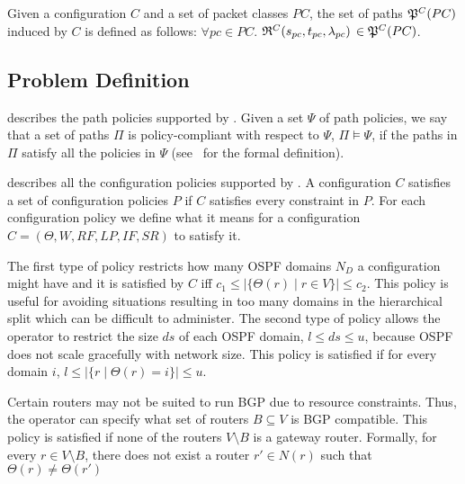 \begin{definition}
Given a configuration $C$ and a set of packet classes $PC$, the set of paths
$\mathfrak{P}^C(PC)$ induced by $C$ is defined as follows: 
$\forall pc \in PC.$ $\mathfrak{R}^C(s_{pc}, t_{pc}, \lambda_{pc})$ $\in \mathfrak{P}^C(PC)$.
\end{definition}

\subsection{Problem Definition}



 describes the path policies supported by \name.
Given  a set $\Psi$ of
path policies, we say that
a set of paths $\Pi$ is policy-compliant with respect to $\Psi$, $\Pi \models \Psi$,
if the paths in $\Pi$ satisfy all the policies in $\Psi$ (see~\cite{genesis} for the formal definition). 


 describes all the configuration policies supported by \name.
A configuration $C$ satisfies a set of configuration policies $P$
if $C$ satisfies every constraint in $P$.
For each configuration policy 
we define what it means for  a configuration $C=(\Theta,W,RF,LP,IF,SR)$ to satisfy it.

The first type of policy restricts how many OSPF domains $N_D$ a
configuration might have
and it is satisfied by $C$ iff $c_1\leq |\{\Theta(r)\mid r\in V\}|\leq
c_2$.  This policy is useful for avoiding situations resulting in too
many domains in the hierarchical split which can be difficult to
administer.  The second type of policy allows the operator to restrict
the size $ds$ of each OSPF domain, $l\leq ds\leq u$, because OSPF does
not scale gracefully with network size.  This policy is satisfied if
for every domain $i$, $l\leq |\{r \mid \Theta(r)=i\}|\leq u$.


Certain 
	routers may not be suited to run BGP due to resource
	constraints. Thus, the operator can specify what set of 
	routers $B\subseteq V$ is BGP compatible.  
	This policy is satisfied if none of the routers $V\setminus B$
	is a gateway router.
	Formally, for every $r\in V\setminus B$,
	there does not exist a router $r'\in N(r)$ such that $\Theta(r) \not= \Theta(r')$

